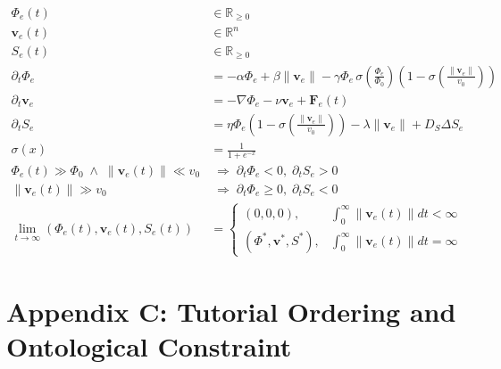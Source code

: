 \documentclass[11pt,oneside]{article}
\begin{document}
\begin{align}
\Phi_e(t) &\in \mathbb{R}_{\ge 0} \\[6pt]
\mathbf{v}_e(t) &\in \mathbb{R}^n \\[6pt]
S_e(t) &\in \mathbb{R}_{\ge 0} \\[10pt]

\partial_t \Phi_e
&= -\alpha \Phi_e
+ \beta \|\mathbf{v}_e\|
- \gamma \Phi_e
\,\sigma\!\left(\frac{\Phi_e}{\Phi_0}\right)
\left(1 - \sigma\!\left(\frac{\|\mathbf{v}_e\|}{v_0}\right)\right)
\\[12pt]

\partial_t \mathbf{v}_e
&= -\nabla \Phi_e
- \nu \mathbf{v}_e
+ \mathbf{F}_e(t)
\\[12pt]

\partial_t S_e
&= \eta \Phi_e
\left(1 - \sigma\!\left(\frac{\|\mathbf{v}_e\|}{v_0}\right)\right)
- \lambda \|\mathbf{v}_e\|
+ D_S \Delta S_e
\\[12pt]

\sigma(x) &= \frac{1}{1 + e^{-x}} \\[10pt]

\Phi_e(t) \gg \Phi_0 \;\wedge\; \|\mathbf{v}_e(t)\| \ll v_0
&\;\Longrightarrow\;
\partial_t \Phi_e < 0,\;
\partial_t S_e > 0
\\[12pt]

\|\mathbf{v}_e(t)\| \gg v_0
&\;\Longrightarrow\;
\partial_t \Phi_e \ge 0,\;
\partial_t S_e < 0
\\[12pt]

\lim_{t \to \infty}
\left(
\Phi_e(t), \mathbf{v}_e(t), S_e(t)
\right)
&=
\begin{cases}
(0, 0, 0), & \int_0^\infty \|\mathbf{v}_e(t)\| dt < \infty \\[6pt]
(\Phi^\ast, \mathbf{v}^\ast, S^\ast), &
\int_0^\infty \|\mathbf{v}_e(t)\| dt = \infty
\end{cases}
\end{align}

\section{Appendix C: Tutorial Ordering and Ontological Constraint}
\end{document}
